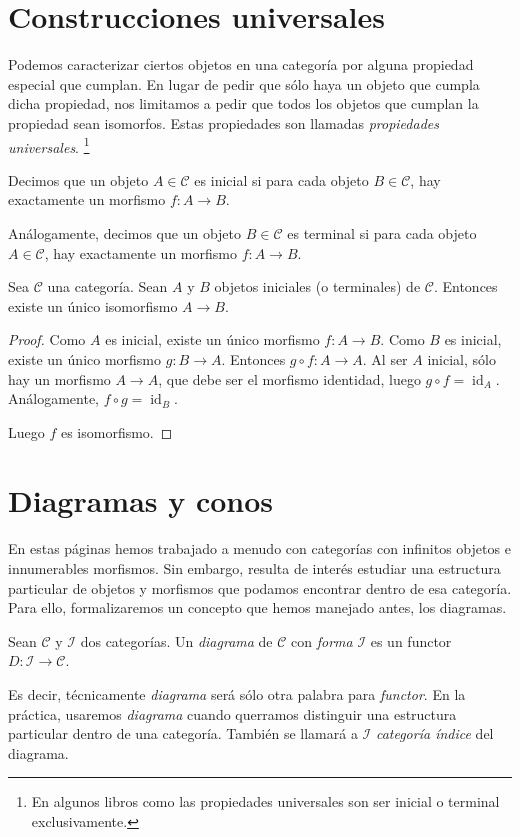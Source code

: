 \documentclass[12pt, twoside]{book}
\newcommand{\cat}{{\mathcal{C}}}
\DeclareMathOperator{\id}{id}
\begin{document}
\section{Construcciones universales}
Podemos caracterizar ciertos objetos en una categoría por alguna propiedad especial que cumplan. En lugar de pedir que sólo haya un objeto que cumpla dicha propiedad, nos limitamos a pedir que todos los objetos que cumplan la propiedad sean isomorfos. Estas propiedades son llamadas \emph{propiedades universales}.
\footnote{En algunos libros como \cite{Spivak} las propiedades universales son ser inicial o terminal exclusivamente.}

\begin{definition}
Decimos que un objeto $A \in \cat$ es inicial si para cada objeto $B \in \cat$, hay exactamente un morfismo $f \colon A \to B$.

Análogamente, decimos que un objeto $B \in \cat$ es terminal si para cada objeto $A \in \cat$, hay exactamente un morfismo $f \colon A \to B$.
\end{definition}

\begin{proposition}
Sea $\cat$ una categoría. Sean $A$ y $B$ objetos iniciales (o terminales) de $\cat$.
Entonces existe un único isomorfismo $A \to B$.
\end{proposition}
\begin{proof}
Como $A$ es inicial, existe un único morfismo $f \colon A \to B$.
Como $B$ es inicial, existe un único morfismo $g \colon B \to A$.
Entonces $g \circ f \colon A \to A$.
Al ser $A$ inicial, sólo hay un morfismo $A \to A$, que debe ser el morfismo identidad, luego $g \circ f = \id_A$.
Análogamente, $f \circ g = \id_B$.

Luego $f$ es isomorfismo.
\end{proof}

\section{Diagramas y conos}
En estas páginas hemos trabajado a menudo con categorías con infinitos objetos e innumerables morfismos.
Sin embargo, resulta de interés estudiar una estructura particular de objetos y morfismos que podamos encontrar dentro de esa categoría.
Para ello, formalizaremos un concepto que hemos manejado antes, los diagramas.
\begin{definition}
Sean $\cat$ y $\mathcal{I}$ dos categorías. Un \emph{diagrama} de $\cat$ con \emph{forma} $\mathcal{I}$ es un functor $D \colon \mathcal{I} \to \cat$.
\end{definition}
Es decir, técnicamente \emph{diagrama} será sólo otra palabra para \emph{functor}.
En la práctica, usaremos \emph{diagrama} cuando querramos distinguir una estructura particular dentro de una categoría.
También se llamará a $\mathcal{I}$ \emph{categoría índice} del diagrama.
\end{document}
